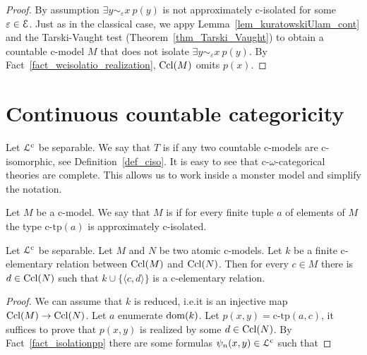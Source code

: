\documentclass{amsproc}
\renewcommand*{\emph}[1]{%
   \smash{\tikz[baseline]\node[rectangle, fill=teal!25, rounded corners, inner xsep=0.5ex, inner ysep=0.2ex, anchor=base, minimum height = 2.7ex]{\strut #1};}}
\begin{document}
{\begin{proof}
  By assumption $\exists y\sim_\varepsilon x\ p(y)$ is not approximately c-isolated for some $\varepsilon\in{\EuScript E}$. 
  Just as in the classical case, we appy Lemma~\ref{lem_kuratowskiUlam_cont} and the Tarski-Vaught test (Theorem~\ref{thm_Tarski_Vaught}) to obtain a countable c-model $M$ that does not isolate $\exists y\sim_\varepsilon x\ p(y)$.
  By Fact~\ref{fact_wcisolatio_realization}, ${\rm Ccl}(M)$ omits $p(x)$. 
\end{proof}

\section{Continuous countable categoricity}

\def\ceq#1#2#3{\parbox[t]{25ex}{$\displaystyle #1$}\parbox[t]{6ex}{$\displaystyle\hfil #2$}{$\displaystyle #3$}}

Let ${\EuScript L}^{\rm c}$ be separable.
We say that $T$ is \emph{c-$\omega$-categorical\/} if any two countable c-models are c-isomorphic, see Definition~\ref{def_ciso}.
It is easy to see that c-$\omega$-categorical theories are complete.
This allows us to work inside a monster model and simplify the notation.

Let $M$ be a c-model.
We say that $M$ is \emph{atomic\/} if for every finite tuple $a$ of elements of $M$ the type $\mbox{c-tp}(a)$ is approximately c-isolated.

\begin{lemma}\label{lem_atomic_iso}
  Let ${\EuScript L}^{\rm c}$ be separable.
  Let $M$ and $N$ be two atomic c-models.
  Let $k$ be a finite c-elementary relation between ${\rm Ccl}(M)$ and ${\rm Ccl}(N)$.
  Then for every $c\in M$ there is $d\in{\rm Ccl}(N)$ such that $k\cup\{\langle c,d\rangle\}$ is a c-elementary relation.
\end{lemma}

\begin{proof}
  We can assume that $k$ is reduced, i.e.\@ it is an injective map ${\rm Ccl}(M)\rightarrow{\rm Ccl}(N)$.
  Let $a$ enumerate ${\rm dom}(k)$.
  Let $p(x,y)=\mbox{c-tp}(a,c)$, it suffices to prove that $p(x,y)$ is realized by some $d\in{\rm Ccl}(N)$.
  By Fact~\ref{fact_isolationpp} there are some formulas $\psi_n(x,y)\in{\EuScript L}^{\rm c}$ such that
  

\end{proof}}
\end{document}
